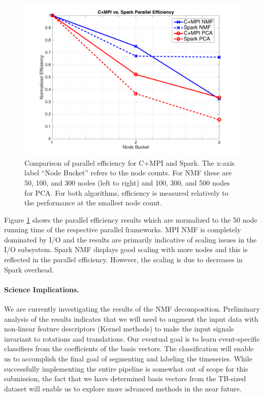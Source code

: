 \begin{figure}[h]
\centering
\includegraphics[width=\textwidth]{fig/peff.png}
\caption{Comparison of parallel efficiency for C+MPI and Spark. The x-axis label ``Node Bucket'' refers to the node counts. For NMF these are 50, 100, and 300 nodes (left to right) and 100, 300, and 500 nodes for PCA. For both algorithms, efficiency is measured relatively to the performance at the smallest node count.}
\label{fig:peff}
\end{figure}

Figure \ref{fig:peff} shows the parallel efficiency results which are normalized to the 50 node running time of the respective parallel frameworks. MPI NMF is completely dominated by I/O and the results are primarily indicative of scaling issues in the I/O subsystem. Spark NMF displays good scaling with more nodes and this is reflected in the parallel efficiency. However, the scaling is due to decreases in Spark overhead.

\paragraph{Science Implications.}
We are currently investigating the results of the NMF decomposition. Preliminary analysis of the results indicates that we will need to augment the input data with non-linear feature descriptors (Kernel methods) to make the input signals invariant to rotations and translations. Our eventual goal is to learn event-specific classifiers from the coefficients of the basis vectors. The classification will enable us to accomplish the final goal of segmenting and labeling the timeseries. While successfully implementing the entire pipeline is somewhat out of scope for this submission, the fact that we have determined basis vectors from the TB-sized dataset will enable us to explore more advanced methods in the near future.

